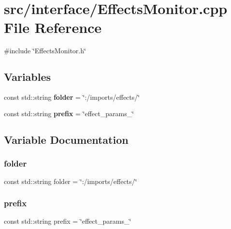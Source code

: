 \section{src/interface/\+Effects\+Monitor.cpp File Reference}
\label{_effects_monitor_8cpp}
{\ttfamily \#include \char`\"{}Effects\+Monitor.\+h\char`\"{}}\newline
\subsection*{Variables}
\begin{DoxyCompactItemize}
\item 
const std\+::string \textbf{ folder} = \char`\"{}\+:/imports/effects/\char`\"{}
\item 
const std\+::string \textbf{ prefix} = \char`\"{}effect\+\_\+params\+\_\+\char`\"{}
\end{DoxyCompactItemize}


\subsection{Variable Documentation}
\mbox{\label{_effects_monitor_8cpp_a7d12c829102e159f2dad326da67ef6b4}} 
\subsubsection{folder}
{\footnotesize\ttfamily const std\+::string folder = \char`\"{}\+:/imports/effects/\char`\"{}}

\mbox{\label{_effects_monitor_8cpp_a0abd588aaee05a454b90c7f20c5b7bb4}} 
\subsubsection{prefix}
{\footnotesize\ttfamily const std\+::string prefix = \char`\"{}effect\+\_\+params\+\_\+\char`\"{}}

